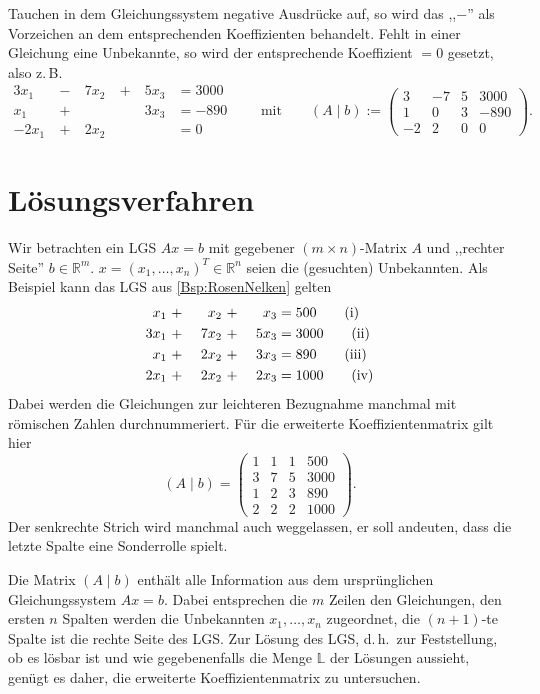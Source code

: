 \documentclass[a4paper,11pt,oneside]{article}
\theoremstyle{definition}
\def\RM#1{\uppercase\expandafter{\romannumeral #1\relax}}
\begin{document}
Tauchen in dem Gleichungssystem negative Ausdrücke auf, so wird das ,,$-$'' als Vorzeichen an dem entsprechenden Koeffizienten behandelt. Fehlt in einer Gleichung eine Unbekannte, so wird der entsprechende Koeffizient $=0$ gesetzt, also z.\,B.
$$
\begin{aligned}
3x_1&\ -\ &7x_2&\ +\ &5x_3&=3000 \\
x_1&\ +\ &&\ \ &3x_3&=-890 \\
-2x_1&\ +\ &2x_2&\ \ &&=0
\end{aligned}
\qquad\text{mit}\qquad (A\mid b)
:=\left(\begin{array}{ccc|c}
3&-7& 5& 3000\\
1&0&3& -890\\
-2&2 &0& 0
\end{array}\right).
$$



\section{Lösungsverfahren}

Wir betrachten ein LGS $ Ax=b $ mit gegebener $(m\times n)$-Matrix $A$ und ,,rechter Seite'' $b\in\mathbb R^m$. $x=(x_1 ,\ldots, x_n)^T\in\mathbb R^n$ seien die (gesuchten) Unbekannten. Als Beispiel kann das LGS aus \eqref{Bsp:RosenNelken} gelten
\begin{alignat}{4}
x_1&\ +\ &x_2&\ +\ &x_3&=500 \tag{\RM{1}}\\
3x_1&\ +\ &7x_2&\ +\ &5x_3&=3000 \tag{\RM{2}}\\
x_1&\ +\ &2x_2&\ +\ &3x_3&=890 \tag{\RM{3}}\\
2x_1&\ +\ &2x_2&\ +\ &2x_3&=1000 \tag{\RM{4}}
\end{alignat}
Dabei werden die Gleichungen zur leichteren Bezugnahme manchmal mit römischen Zahlen durchnummeriert. Für die erweiterte Koeffizientenmatrix gilt hier
$$
(A\mid b)=\left(\begin{array}{ccc|c}
1&1&1&500\\
3&7&5&3000\\
1&2&3&890\\
2&2&2&1000
\end{array}\right).
$$
Der senkrechte Strich wird manchmal auch weggelassen, er soll andeuten, dass die letzte Spalte eine Sonderrolle spielt.

Die Matrix $(A\mid b)$ enthält alle Information aus dem ursprünglichen Gleichungssystem $ Ax=b$. Dabei entsprechen die $m$ Zeilen den Gleichungen, den ersten $n$ Spalten werden die Unbekannten $x_1,\ldots,x_n$ zugeordnet, die $(n+1)$-te Spalte ist die rechte Seite des LGS. Zur Lösung des LGS, d.\,h.\ zur Feststellung, ob es lösbar ist und wie gegebenenfalls die Menge $\mathbb L$ der Lösungen aussieht, genügt es daher, die erweiterte Koeffizientenmatrix zu untersuchen.
\end{document}

